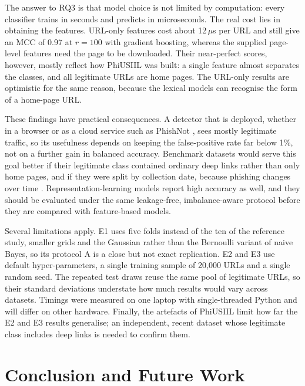 \documentclass[pdflatex,sn-mathphys-num]{sn-jnl}%
\theoremstyle{thmstyleone}%
\theoremstyle{thmstyletwo}%
\theoremstyle{thmstylethree}%
\begin{document}
The answer to RQ3 is that model choice is not limited by computation: every classifier trains in seconds and predicts in microseconds. The real cost lies in obtaining the features. URL-only features cost about 12\,$\mu$s per URL and still give an MCC of 0.97 at $r=100$ with gradient boosting, whereas the supplied page-level features need the page to be downloaded. Their near-perfect scores, however, mostly reflect how PhiUSIIL was built: a single feature almost separates the classes, and all legitimate URLs are home pages. The URL-only results are optimistic for the same reason, because the lexical models can recognise the form of a home-page URL.

These findings have practical consequences. A detector that is deployed, whether in a browser or as a cloud service such as PhishNot \cite{alani2022}, sees mostly legitimate traffic, so its usefulness depends on keeping the false-positive rate far below 1\%, not on a further gain in balanced accuracy. Benchmark datasets would serve this goal better if their legitimate class contained ordinary deep links rather than only home pages, and if they were split by collection date, because phishing changes over time \cite{gama2014}. Representation-learning models \cite{le2018,elsadig2022} report high accuracy as well, and they should be evaluated under the same leakage-free, imbalance-aware protocol before they are compared with feature-based models.

Several limitations apply. E1 uses five folds instead of the ten of the reference study, smaller grids and the Gaussian rather than the Bernoulli variant of naive Bayes, so its protocol A is a close but not exact replication. E2 and E3 use default hyper-parameters, a single training sample of 20,000 URLs and a single random seed. The repeated test draws reuse the same pool of legitimate URLs, so their standard deviations understate how much results would vary across datasets. Timings were measured on one laptop with single-threaded Python and will differ on other hardware. Finally, the artefacts of PhiUSIIL limit how far the E2 and E3 results generalise; an independent, recent dataset whose legitimate class includes deep links is needed to confirm them.

\section{Conclusion and Future Work}\label{sec7}
\end{document}
